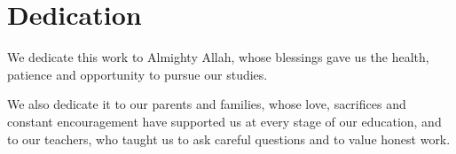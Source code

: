 \newpage
\thispagestyle{empty}
\chapter*{\centering Dedication}
\par\bigskip

We dedicate this work to Almighty Allah, whose blessings gave us the health, patience and opportunity to pursue our studies.

We also dedicate it to our parents and families, whose love, sacrifices and constant encouragement have supported us at every stage of our education, and to our teachers, who taught us to ask careful questions and to value honest work.
